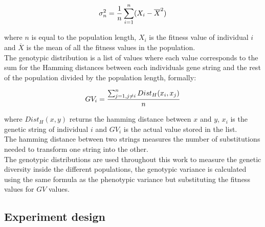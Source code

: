 \begin{equation*}
\sigma^2_n = {1\over{n}}\sum^n_{i=1}(X_i - \overline{X}^2) 
\end{equation*}

where $n$ is equal to the population length, $X_i$ is the fitness value of individual $i$ and $\overline{X}$ is the mean of all the fitness values in the population.
\\The genotypic distribution is a list of values where each value corresponds to the sum for the Hamming distances between each individuals gene string and the rest of the population divided by the population length, formally:

\begin{equation*} 
GV_i = {\sum_{j=1, j\neq i}^n Dist_H(x_i, x_j) \over n}
\end{equation*}

where $Dist_H(x, y)$ returns the hamming distance between $x$ and $y$, $x_i$ is the genetic string of individual $i$ and $GV_i$ is the actual value stored in the list.
\\The hamming distance between two strings measures the number of substitutions needed to transform one string into the other.
\\The genotypic distributions are used throughout this work to measure the genetic diversity inside the different populations, the genotypic variance is calculated using the same formula as the phenotypic variance but substituting the fitness values for $GV$ values.

\subsection{Experiment design}
\label{subsection:exp_design}

